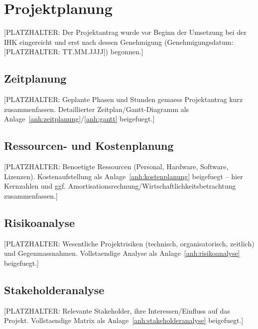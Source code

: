 \chapter{Projektplanung}
\label{ch:projektplanung}

[PLATZHALTER: Der Projektantrag wurde vor Beginn der Umsetzung bei der IHK
eingereicht und erst nach dessen Genehmigung (Genehmigungsdatum:
[PLATZHALTER: TT.MM.JJJJ]) begonnen.]

\section{Zeitplanung}
\label{sec:zeitplanung}
[PLATZHALTER: Geplante Phasen und Stunden gemaess Projektantrag kurz
zusammenfassen. Detaillierter Zeitplan/Gantt-Diagramm als
Anlage~\ref{anh:zeitplanung}/\ref{anh:gantt} beigefuegt.]

\section{Ressourcen- und Kostenplanung}
[PLATZHALTER: Benoetigte Ressourcen (Personal, Hardware, Software,
Lizenzen). Kostenaufstellung als Anlage~\ref{anh:kostenplanung} beigefuegt --
hier Kernzahlen und ggf. Amortisationsrechnung/Wirtschaftlichkeitsbetrachtung
zusammenfassen.]

\section{Risikoanalyse}
[PLATZHALTER: Wesentliche Projektrisiken (technisch, organisatorisch,
zeitlich) und Gegenmassnahmen. Vollstaendige Analyse als
Anlage~\ref{anh:risikoanalyse} beigefuegt.]

\section{Stakeholderanalyse}
[PLATZHALTER: Relevante Stakeholder, ihre Interessen/Einfluss auf das
Projekt. Vollstaendige Matrix als Anlage~\ref{anh:stakeholderanalyse}
beigefuegt.]
